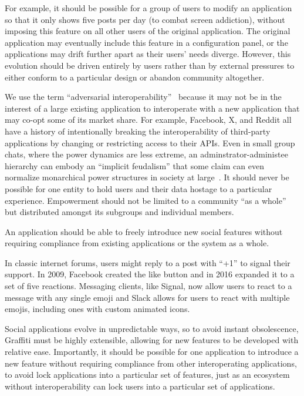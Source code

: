 For example, it should be possible for a group of users to
modify an application so that it only shows five posts per day (to combat screen addiction),
without imposing this feature on all other users of the original application.
The original application may eventually include this feature in a configuration panel,
or the applications may drift further apart as their users' needs diverge. However, this
evolution should be driven entirely by users rather than by external pressures
to either conform to a particular design or abandon community altogether.

We use the term ``adversarial interoperability''~\cite{adversarialinterop} because it may not be in the
interest of a large existing application to interoperate with a new application that may co-opt some of its market share.
For example, Facebook, X, and Reddit all have a history of intentionally breaking
the interoperability of third-party applications by changing or restricting access to their APIs.
Even in small group chats, where the power dynamics are less extreme,
an adminstrator-administee hierarchy
can embody an ``implicit feudalism'' that some claim can even
normalize monarchical power structures in society at large~\cite{governablespaces}.
It should never be possible for one entity to hold users
and their data hostage to a particular experience.
Empowerment should not be limited to a community ``as a whole'' but
distributed amongst its subgroups and individual members.

\begin{requirement}
\label{requirements:autonomous-extensibility}
    An application should be able to freely introduce new social features without requiring compliance from existing applications or the system as a whole.
\end{requirement}

In classic internet forums, users might reply to a post with ``+1'' to signal their support.
In 2009, Facebook created the like button and in 2016 expanded it to a set of five reactions.
Messaging clients, like Signal, now allow users to react to a message with any single emoji and
Slack allows for users to react with multiple emojis, including ones with custom animated icons.

Social applications evolve in unpredictable ways,
so to avoid instant obsolescence, Graffiti must be highly extensible,
allowing for new features
to be developed with relative ease.
Importantly, it should be possible for one application to introduce a new feature
without requiring compliance from other interoperating applications, to avoid
lock applications into a particular set of features,
just as an ecosystem without interoperability can lock users into a
particular set of applications.

